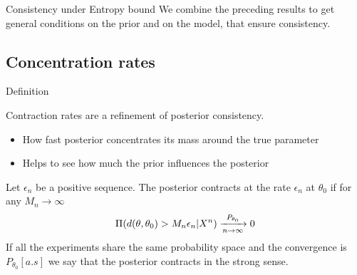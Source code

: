 
\begin{frame}{Consistency under Entropy bound}
We combine the preceding results to get general conditions \alert<2->{on the prior} and \alert<2->{on the model}, that ensure consistency. 
\begin{overprint}
\end{overprint}

\end{frame}



\subsection{Concentration rates}


\begin{frame}{Definition}

Contraction rates are a refinement of posterior consistency. \pause 
\begin{itemize}[<+-|alert@+>]
\item How fast posterior concentrates its mass around the true parameter
\item Helps to see how much the prior influences the posterior
\end{itemize}
\pause 

\begin{definition}
Let $\epsilon_n$ be a positive sequence. The posterior contracts at the rate $\epsilon_n$ at $\theta_0$ if for any $M_n \to \infty$ 
$$
\Pi(d(\theta,\theta_0)> M_n \epsilon_n|X^n) \xrightarrow[n \to \infty]{P_{\theta_0}} 0 
$$
If all the experiments share the same probability space and the convergence is $P_{\theta_0}[a.s]$ we say that the posterior contracts in the strong sense.
\end{definition}

\end{frame}


